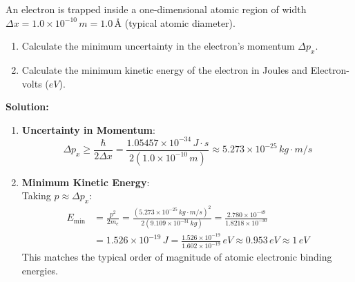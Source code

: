 \begin{example}
An electron is trapped inside a one-dimensional atomic region of width $\Delta x = 1.0 \times 10^{-10}\,\si{m} = 1.0\,\si{\text{\AA}}$ (typical atomic diameter).
\begin{enumerate}
    \item Calculate the minimum uncertainty in the electron's momentum $\Delta p_x$.
    \item Calculate the minimum kinetic energy of the electron in Joules and Electron-volts ($\si{eV}$).
\end{enumerate}

\textbf{Solution:}
\begin{enumerate}
    \item \textbf{Uncertainty in Momentum}:
    \begin{equation*}
        \Delta p_x \ge \frac{\hbar}{2\Delta x} = \frac{1.05457 \times 10^{-34}\,\si{J\cdot s}}{2(1.0 \times 10^{-10}\,\si{m})} \approx 5.273 \times 10^{-25}\,\si{kg\cdot m/s}
    \end{equation*}
    
    \item \textbf{Minimum Kinetic Energy}:\\
    Taking $p \approx \Delta p_x$:
    \begin{align*}
        E_{\text{min}} &= \frac{p^2}{2 m_e} = \frac{(5.273 \times 10^{-25}\,\si{kg\cdot m/s})^2}{2(9.109 \times 10^{-31}\,\si{kg})} = \frac{2.780 \times 10^{-49}}{1.8218 \times 10^{-30}} \\
        &= 1.526 \times 10^{-19}\,\si{J} = \frac{1.526 \times 10^{-19}}{1.602 \times 10^{-19}}\,\si{eV} \approx 0.953\,\si{eV} \approx 1\,\si{eV}
    \end{align*}
    This matches the typical order of magnitude of atomic electronic binding energies.
\end{enumerate}
\end{example}

